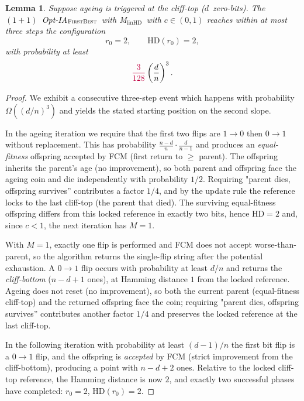 \documentclass[lettersize,journal]{IEEEtran}
\newcommand{\rerev}[1]{\textcolor{purple}{#1}}
\newcommand{\rev}[1]{\textcolor{black}{#1}}
\newcommand{\HD}{\text{HD}}
\newcommand{\linHD}{M$_{\text{linHD}}$}
\newcommand{\firstBest}{$(1+1)$~Opt-IA$_{\textsc{FirstBest}}$}
\newtheorem{lemma}{Lemma}
\begin{document}
 
{







\setcounter{lemma}{3}
\begin{lemma}%
	Suppose ageing is triggered at the cliff-top ($d$~zero-bits).  
	The \rev{\firstBest}~with \linHD\ with $c\in(0,1)$ reaches within at most three steps the 
	configuration
	\[
	r_0=2, \qquad \mathrm{HD}(r_0)=2,
	\]
	with probability at least 
	\[
	\rerev{\frac{3}{128}}\left(\frac{d}{n}\right)^3.
	\]
\end{lemma}

\begin{proof}
	We exhibit a consecutive three-step event which happens with probability $\Omega((d/n)^3)$ and yields the stated starting 
	position on the second slope.
	
	 In the ageing iteration we require that the first two flips are $1\!\to 0$ then $0\!\to 1$ without replacement. This has probability $\frac{n-d}{n}\cdot\frac{d}{n-1}$ and produces an \emph{equal-fitness} offspring accepted by FCM (first return to $\ge$ parent). The offspring inherits the parent's age (no improvement), so both parent and offspring face the ageing coin and die independently with probability $1/2$. Requiring "parent dies, offspring survives'' contributes a factor $1/4$, and by the update rule the reference locks to the last cliff-top (the parent that died). The surviving equal-fitness offspring differs from this locked reference in exactly two bits, hence $\HD=2$ and, since $c<1$, the next iteration has $M=1$.
		
 With $M=1$, exactly one flip is performed and FCM does not accept worse-than-parent, so the algorithm returns the single-flip string after the potential exhaustion. A $0\!\to 1$ flip occurs with probability at least $d/n$ and returns the \emph{cliff-bottom} ($n-d+1$ ones), at Hamming distance $1$ from the locked reference. Ageing does not reset (no improvement), so both the current parent (equal-fitness cliff-top) and the returned offspring face the coin; requiring "parent dies, offspring survives'' contributes another factor $1/4$ and preserves the locked reference at the last cliff-top.
	
 In the following iteration with probability at least $(d-1)/n$ the first bit flip is a $0\!\to 1$ flip, and the offspring is \emph{accepted} by FCM (strict improvement from the cliff-bottom), producing a point with $n-d+2$ ones. Relative to the locked cliff-top reference, the Hamming distance is now $2$, and exactly two successful phases have completed: $r_0=2$, $\HD(r_0)=2$.
	

\end{proof}}
\end{document}
